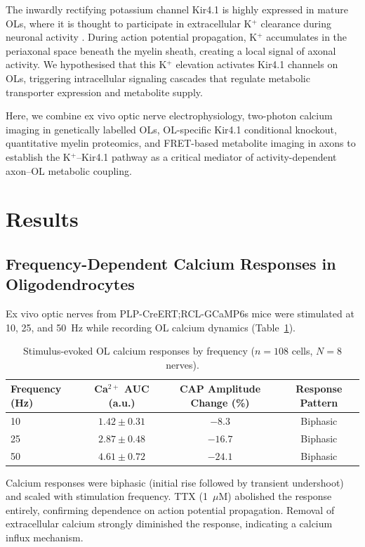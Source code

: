 \documentclass[11pt]{article}
\begin{document}
The inwardly rectifying potassium channel Kir4.1 is highly expressed in mature OLs, where it is thought to participate in extracellular K$^+$ clearance during neuronal activity \citep{neusch2001kir41, larson2018oligodendrocyte}. During action potential propagation, K$^+$ accumulates in the periaxonal space beneath the myelin sheath, creating a local signal of axonal activity. We hypothesised that this K$^+$ elevation activates Kir4.1 channels on OLs, triggering intracellular signaling cascades that regulate metabolic transporter expression and metabolite supply.

Here, we combine ex vivo optic nerve electrophysiology, two-photon calcium imaging in genetically labelled OLs, OL-specific Kir4.1 conditional knockout, quantitative myelin proteomics, and FRET-based metabolite imaging in axons to establish the K$^+$--Kir4.1 pathway as a critical mediator of activity-dependent axon--OL metabolic coupling.

\section{Results}

\subsection{Frequency-Dependent Calcium Responses in Oligodendrocytes}

Ex vivo optic nerves from PLP-CreERT;RCL-GCaMP6s mice were stimulated at 10, 25, and 50~Hz while recording OL calcium dynamics (Table~\ref{tab:calcium}).

\begin{table}[H]
\centering
\caption{Stimulus-evoked OL calcium responses by frequency ($n = 108$ cells, $N = 8$ nerves).}
\label{tab:calcium}
\begin{tabular}{@{}lccc@{}}
\toprule
Frequency (Hz) & Ca$^{2+}$ AUC (a.u.) & CAP Amplitude Change (\%) & Response Pattern \\
\midrule
10 & $1.42 \pm 0.31$ & $-8.3$ & Biphasic \\
25 & $2.87 \pm 0.48$ & $-16.7$ & Biphasic \\
50 & $4.61 \pm 0.72$ & $-24.1$ & Biphasic \\
\bottomrule
\end{tabular}
\end{table}

Calcium responses were biphasic (initial rise followed by transient undershoot) and scaled with stimulation frequency. TTX (1~$\mu$M) abolished the response entirely, confirming dependence on action potential propagation. Removal of extracellular calcium strongly diminished the response, indicating a calcium influx mechanism.
\end{document}

